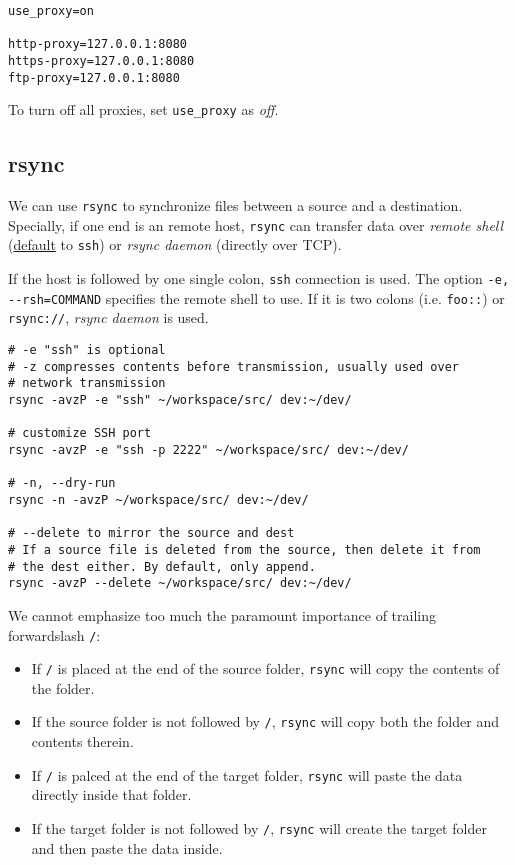\begin{lstlisting}
use_proxy=on

http-proxy=127.0.0.1:8080
https-proxy=127.0.0.1:8080
ftp-proxy=127.0.0.1:8080
\end{lstlisting}

To turn off all proxies, set \lstinline|use_proxy| as
\textit{off}.

\subsection{rsync}
\label{sec:rsync}

We can use \lstinline|rsync| to synchronize files between a source
and a destination. Specially, if one end is an remote host,
\lstinline|rsync| can transfer data over \textit{remote shell}
(\href{https://serverfault.com/q/378939}{default} to
\lstinline|ssh|) or \textit{rsync daemon} (directly over TCP).

If the host is followed by one single colon, \lstinline|ssh|
connection is used. The option \lstinline|-e, --rsh=COMMAND|
specifies the remote shell to use. If it is two colons
(i.e. \lstinline|foo::|) or \lstinline|rsync://|, \textit{rsync
  daemon} is used.

\begin{lstlisting}
# -e "ssh" is optional
# -z compresses contents before transmission, usually used over
# network transmission
rsync -avzP -e "ssh" ~/workspace/src/ dev:~/dev/

# customize SSH port
rsync -avzP -e "ssh -p 2222" ~/workspace/src/ dev:~/dev/

# -n, --dry-run
rsync -n -avzP ~/workspace/src/ dev:~/dev/

# --delete to mirror the source and dest
# If a source file is deleted from the source, then delete it from
# the dest either. By default, only append.
rsync -avzP --delete ~/workspace/src/ dev:~/dev/
\end{lstlisting}

We cannot emphasize too much the paramount importance of trailing
forwardslash \verb|/|:

\begin{itemize}
\item If \verb|/| is placed at the end of the source folder,
  \verb|rsync| will copy the contents of the folder.
\item If the source folder is not followed by \verb|/|,
  \lstinline|rsync| will copy both the folder and contents
  therein.
\item If \verb|/| is palced at the end of the target folder,
  \lstinline|rsync| will paste the data directly inside that
  folder.
\item If the target folder is not followed by \verb|/|,
  \lstinline|rsync| will create the target folder and then paste
  the data inside.
\end{itemize}

